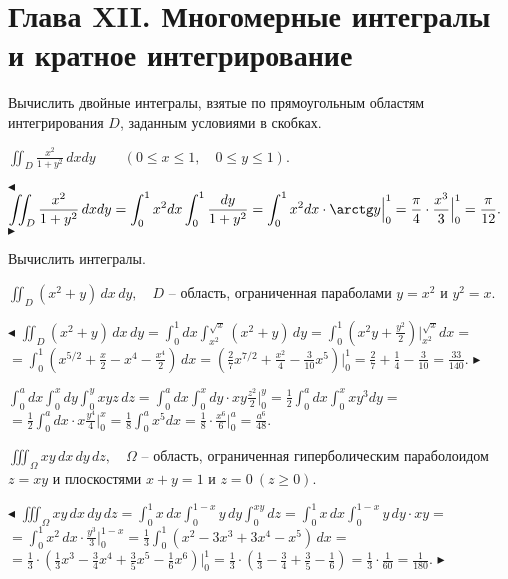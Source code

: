 \documentclass[a5paper,10pt]{article}
\begin{document}

\bigskip
\section* {Глава XII. Многомерные интегралы и кратное интегрирование}

\medskip
\noindent Вычислить двойные интегралы, взятые по прямоугольным областям интегрирования $D$, заданным условиями в скобках.

\medskip\noindent
{} $\displaystyle \iint_D\frac{x^2}{1+y^2}\,dxdy\qquad (0\le x \le1,\quad 0\le y\le 1)$.

\smallskip
\noindent $\blacktriangleleft$ $\displaystyle \iint_D\frac{x^2}{1+y^2}\,dxdy=\int_0^1x^2dx\int_0^1\frac{dy}{1+y^2}=
\int_0^1x^2dx\cdot\arctg y\Big|_0^1=\frac{\pi}{4}\cdot\frac{x^3}{3}\Big|_0^1=\frac{\pi}{12}.$
$\blacktriangleright$

\medskip\noindent
Вычислить интегралы.

\medskip
{} $\displaystyle \iint_D(x^2+y)\,dx\,dy,\quad D$ -- область, ограниченная параболами
$y=x^2$ и $y^2=x$.

\smallskip
\noindent $\blacktriangleleft$ $\displaystyle \iint_D(x^2+y)\,dx\,dy=
\int_0^1dx\int_{x^2}^{\sqrt x}(x^2+y)\,dy=
\int_0^1\left(x^2y+\frac{y^2}{2}\right)\Big|_{x^2}^{\sqrt x}dx=$\\
$\displaystyle =\int_0^1\left(x^{5/2}+\frac{x}{2}-x^4-\frac{x^4}{2}\right)\,dx
=\left(\frac27x^{7/2}+\frac{x^2}{4}-\frac{3}{10}x^5\right)\Big|_0^1
=\frac27+\frac{1}{4}-\frac{3}{10}=\frac{33}{140}.$ $\blacktriangleright$

\medskip
{} $\displaystyle \int_0^a dx\int_0^x dy\int_0^y xyz\,dz=
\int_0^a dx\int_0^x dy\cdot xy\frac{z^2}{2}\Big|_0^y=\frac12\int_0^a dx\int_0^xxy^3dy=$\\
$\displaystyle =\frac12\int_0^a dx\cdot x\frac{y^4}{4}\Big|_0^x=\frac18\int_0^a x^5 dx=
\frac18\cdot\frac{x^6}{6}\Big|_0^a=\frac{a^6}{48}$.

\medskip
{} $\displaystyle \iiint_\Omega xy\,dx\,dy\,dz,\quad\Omega$ -- область, ограниченная
гиперболическим параболоидом $z=xy$ и плоскостями $x+y=1$ и $z=0\ (z\ge0)$.

\smallskip\noindent $\blacktriangleleft$ $\displaystyle \iiint_\Omega xy\,dx\,dy\,dz=
\int_0^1x\,dx\int_0^{1-x}y\,dy\int_0^{xy}dz=\int_0^1x\,dx\int_0^{1-x}y\,dy\cdot xy=$\\
$\displaystyle =\int_0^1x^2\,dx\cdot\frac{y^3}{3}\Big|_0^{1-x}=\frac13\int_0^1(x^2-3x^3+3x^4-x^5)\,dx=$\\
$\displaystyle =\frac13\cdot\left(\frac13x^3-\frac34x^4+\frac35x^5-\frac16x^6\right)\Big|_0^1=
\frac13\cdot\left(\frac13-\frac34+\frac35-\frac16\right)=\frac13\cdot\frac{1}{60}=\frac{1}{180}$.
$\blacktriangleright$
\end{document}
